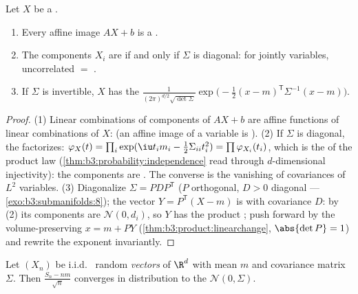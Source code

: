 \begin{theorem}\label{thm:b3:clt:gaussianvector}
Let $X$ be a .
\begin{enumerate}
  \item Every affine image $AX + b$ is a .
  \item The components $X_i$ are \emph{} if and
        only if $\Sigma$ is diagonal: for jointly 
        variables, uncorrelated $=$ .
  \item If $\Sigma$ is invertible, $X$ has the 
        $\frac{1}{(2\pi)^{d/2}\sqrt{\det\Sigma}}
        \exp\bigl(-\frac12(x - m)^{\mathsf T}\Sigma^{-1}(x -
        m)\bigr)$.
\end{enumerate}
\end{theorem}

\begin{proof}
(1) Linear combinations of components of $AX + b$ are affine
functions of linear combinations of $X$:  (an affine
image of a  variable is ).
(2) If $\Sigma$ is diagonal, the 
factorizes: $\varphi_X(t) = \prod_i\exp(\iu t_im_i -
\frac12\Sigma_{ii}t_i^2) = \prod\varphi_{X_i}(t_i)$, which is
the  of the product law
(\cref{thm:b3:probability:independence} read through
$d$-dimensional injectivity): the components are .
The converse is the vanishing of covariances of 
$L^2$ variables.
(3) Diagonalize $\Sigma = P D P^{\mathsf T}$ ($P$ orthogonal,
$D > 0$ diagonal --- \cref{exo:b3:submanifolds:8}); the
vector $Y = P^{\mathsf T}(X - m)$ is  with
covariance $D$: by (2) its components are 
$\mathcal N(0, d_i)$, so $Y$ has the product ; push
forward by the volume-preserving $x = m + PY$
(\cref{thm:b3:product:linearchange}, $\abs{\det P} = 1$) and
rewrite the exponent invariantly.
\end{proof}

\begin{theorem}
\label{thm:b3:clt:multiclt}
Let $(X_n)$ be i.i.d.\  random
\emph{vectors} of $\R^d$ with mean $m$ and covariance matrix
$\Sigma$. Then $\frac{S_n - nm}{\sqrt n}$ converges in
distribution to the  $\mathcal N(0,
\Sigma)$.
\admitted
\end{theorem}

